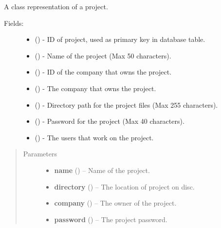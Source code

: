 \documentclass[letterpaper,10pt,english]{sphinxmanual}
\begin{document}
\begin{fulllineitems}
\label{models:models.Project}
A class representation of a project.
\begin{description}
\item[{Fields:}] \leavevmode\begin{itemize}
\item {} 
        ()        - ID of project, used as primary key in database table.

\item {} 
        ()        - Name of the project (Max 50 characters).

\item {} 
        ()        - ID of the company that owns the project.

\item {} 
 ()        - The company that owns the project.

\item {} 
        ()        - Directory path for the project files (Max 255 characters).

\item {} 
        ()        - Password for the project (Max 40 characters).

\item {} 
 ()        - The users that work on the project.

\end{itemize}

\end{description}
\begin{quote}\begin{description}
\item[{Parameters}] \leavevmode\begin{itemize}
\item {} 
\textbf{name} () -- Name of the project.

\item {} 
\textbf{directory} () -- The location of project on disc.

\item {} 
\textbf{company} ({\hyperref[models:models.Company]{}}) -- The owner of the project.

\item {} 
\textbf{password} () -- The project password.

\end{itemize}

\end{description}\end{quote}

\end{fulllineitems}
\end{document}
